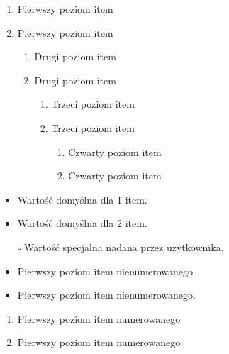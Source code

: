 \documentclass[a4paper,12pt]{article}
\begin{document}
	
	\renewcommand{\labelenumi}{\Roman{enumi}}
	\renewcommand{\labelenumii}{ \Roman{enumi}.\arabic{enumii} }
	\renewcommand{\labelenumiii}{\Alph{enumiii}}
	\renewcommand{\labelenumiv}{\alph{enumiv}}
	\begin{enumerate}
		\item Pierwszy poziom item
		\item Pierwszy poziom item
		\begin{enumerate}
			\item Drugi poziom item
			\item Drugi poziom item
			\begin{enumerate}
				\item Trzeci poziom item
				\item Trzeci poziom item
				\begin{enumerate}
					\item Czwarty poziom item
					\item Czwarty poziom item
				\end{enumerate}
			\end{enumerate}
		\end{enumerate}
	\end{enumerate}
	
	
	\begin{itemize}
		\item Wartość domyślna dla 1 item.
		\item Wartość domyślna dla 2 item.
		\item[$\square$] Wartość specjalna nadana przez użytkownika.
	\end{itemize}
	
	
	\begin{itemize}[label= \textasteriskcentered]
		\item Pierwszy poziom item nienumerowanego.
		\item Pierwszy poziom item nienumerowanego.
	\end{itemize}
	\begin{enumerate}[label={(\alph*)}]
		\item Pierwszy poziom item numerowanego
		\item Pierwszy poziom item numerowanego
	\end{enumerate}
	
\end{document}
